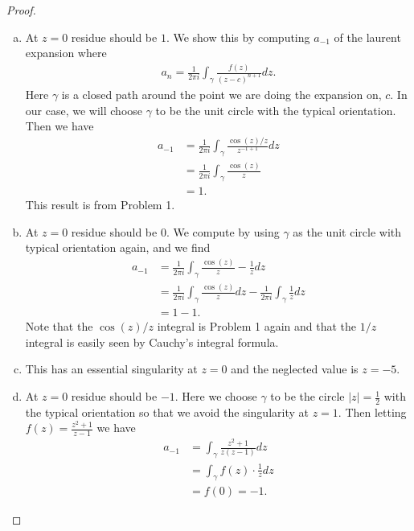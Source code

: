 \documentclass[leqno]{article}
\theoremstyle{nonumberplain}
\newtheorem{proof}{Proof}
\begin{document}
\begin{proof}~
\begin{enumerate}[(a)]
\item At $z=0$ residue should be $1$. We show this by computing $a_{-1}$ of the laurent expansion where
\begin{align*}
a_n=\frac{1}{2\pi i} \int_\gamma \frac{f(z)}{(z-c)^{n+1}}dz.
\end{align*}
Here $\gamma$ is a closed path around the point we are doing the expansion on, $c$. In our case, we will choose $\gamma$ to be the unit circle with the typical orientation. Then we have
\begin{align*}
a_{-1}&=\frac{1}{2\pi i} \int_\gamma \frac{\cos(z)/z}{z^{-1+1}}dz\\
&= \frac{1}{2\pi i}\int_\gamma \frac{\cos(z)}{z}\\
&=1.
\end{align*}
This result is from Problem 1.
\item At $z=0$ residue should be $0$. We compute by using $\gamma$ as the unit circle with typical orientation again, and we find
\begin{align*}
a_{-1}&=\frac{1}{2\pi i} \int_\gamma \frac{\cos(z)}{z}-\frac{1}{z}dz\\
&= \frac{1}{2\pi i} \int_\gamma \frac{\cos(z)}{z}dz - \frac{1}{2\pi i} \int_\gamma \frac{1}{z}dz\\
&=1-1.
\end{align*}
Note that the $\cos(z)/z$ integral is Problem 1 again and that the $1/z$ integral is easily seen by Cauchy's integral formula.
\item This has an essential singularity at $z=0$ and the neglected value is $z=-5$.
\item At $z=0$ residue should be $-1$. Here we choose $\gamma$ to be the circle $|z|=\frac{1}{2}$ with the typical orientation so that we avoid the singularity at $z=1$.  Then letting $f(z)=\frac{z^2+1}{z-1}$ we have
\begin{align*}
a_{-1}&= \int_\gamma \frac{z^2+1}{z(z-1)}dz\\
&= \int_\gamma f(z)\cdot \frac{1}{z}dz\\
&= f(0) = -1.
\end{align*}
\end{enumerate}
\end{proof}
\end{document}
